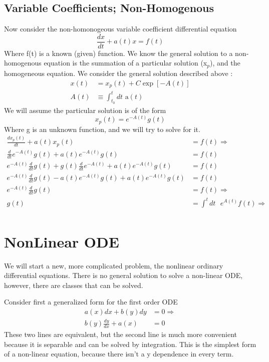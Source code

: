 \documentclass{article}
\newcommand{\be}{\begin{equation}}
\newcommand{\ee}{\end{equation}}
\begin{document}
\subsection*{Variable Coefficients; Non-Homogenous}
Now consider the non-homonogeous variable coefficient differential equation
\be
\frac{dx}{dt} + a(t) x = f(t)
\ee
Where f(t) is a known (given) function.
We know the general solution to a non-homogenous equation is the summation of a particular solution (x$_p$), and the homogeneous equation.
We consider the general solution described above :
\be
\begin{split}
    x(t) &= x_p(t) + C\exp\left[ -A(t) \right]\\
    A(t) & \equiv \int_{t_0}^t dt \text{ a}(t)
\end{split}
\ee
We will assume the particular solution is of the form
\be
x_p(t) = e^{-A(t)}g(t)
\ee
Where g is an unknown function, and we will try to solve for it.
\be
\begin{split}
    \frac{dx_p(t)}{dt} + a(t) x_p(t) &= f(t) \Rightarrow \\
    \frac{d}{dt} e^{-A(t)}g(t) + a(t)  e^{-A(t)}g(t) &= f(t)\\
    e^{-A(t)} \frac{d}{dt} g(t) + g(t) \frac{d}{dt} e^{-A(t)} + a(t)  e^{-A(t)}g(t) &= f(t)\\
    e^{-A(t)} \frac{d}{dt} g(t) -a(t) e^{-A(t)} g(t) + a(t)  e^{-A(t)}g(t) &= f(t)\\
    e^{-A(t)} \frac{d}{dt} g(t) &= f(t) \Rightarrow \\
    g(t) &= \int^t dt \text{ }e^{A(t)} f(t) \Rightarrow \\
\end{split}
\ee

\section*{NonLinear ODE}
We will start a new, more complicated problem, the nonlinear ordinary differential equations.
There is no general solution to solve a non-linear ODE, however, there are classes that can be solved.

Consider first a generalized form for the first order ODE
\be
\begin{split}
    a(x) dx + b(y) dy &= 0 \Rightarrow\\
    b(y) \frac{dy}{dx} + a(x) &= 0
\end{split}
\ee
These two lines are equivalent, but the second line is much more convenient because it is separable and can be solved by integration.
This is the simplest form of a non-linear equation, because there isn't a y dependence in every term.
\end{document}
